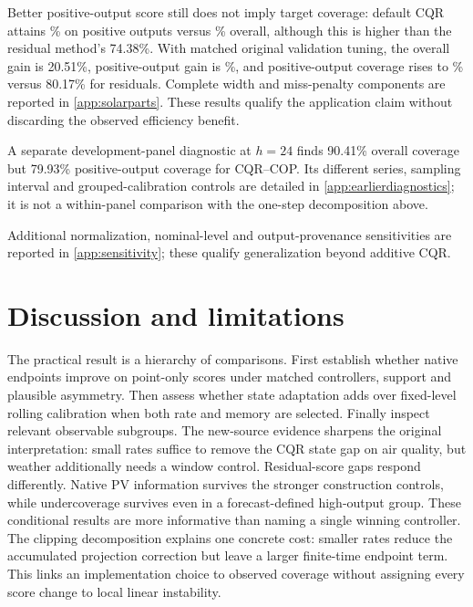 \documentclass[preprint,11pt]{elsarticle}
\begin{document}
Better positive-output score still does not imply target coverage: default CQR attains
\PVDefaultPositiveCoverage\% on positive outputs versus \PVDefaultOverallCoverage\% overall, although this is higher than the
residual method's 74.38\%. With matched original validation tuning, the overall gain
is 20.51\%, positive-output gain is \PVTunedPositiveGain\%, and positive-output coverage rises to
\PVTunedPositiveCoverage\% versus 80.17\% for residuals. Complete width and miss-penalty components are
reported in \ref{app:solarparts}. These results qualify the application claim without
discarding the observed efficiency benefit.

A separate development-panel diagnostic at $h=24$ finds 90.41\% overall
coverage but 79.93\% positive-output coverage for CQR--COP. Its different series,
sampling interval and grouped-calibration controls are detailed in
\ref{app:earlierdiagnostics}; it is not a within-panel comparison with the
one-step decomposition above.

Additional normalization, nominal-level and output-provenance sensitivities are
reported in \ref{app:sensitivity}; these qualify generalization beyond additive CQR.



\section{Discussion and limitations}
The practical result is a hierarchy of comparisons. First establish whether native
endpoints improve on point-only scores under matched controllers, support and plausible
asymmetry. Then assess whether state adaptation adds over fixed-level rolling calibration
when both rate and memory are selected. Finally inspect relevant observable subgroups.
The new-source evidence sharpens the original interpretation: small rates suffice to
remove the CQR state gap on air quality, but weather additionally needs a window
control. Residual-score gaps respond differently. Native PV information survives the
stronger construction controls, while undercoverage survives even in a forecast-defined
high-output group. These conditional results are more informative than naming a single
winning controller.
The clipping decomposition explains one concrete cost: smaller rates reduce the
accumulated projection correction but leave a larger finite-time endpoint term.
This links an implementation choice to observed coverage without assigning every
score change to local linear instability.
\end{document}
